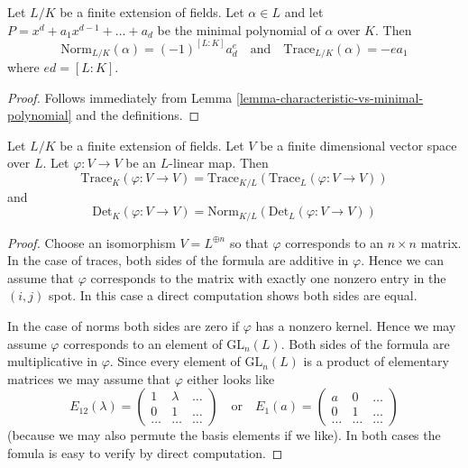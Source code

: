 \begin{lemma}
\label{lemma-trace-and-norm-from-minimal-polynomial}
Let $L/K$ be a finite extension of fields. Let $\alpha \in L$ and let
$P = x^d + a_1 x^{d - 1} + \ldots + a_d$
be the minimal polynomial of $\alpha$ over $K$. Then
$$
\text{Norm}_{L/K}(\alpha) = (-1)^{[L : K]} a_d^e
\quad\text{and}\quad
\text{Trace}_{L/K}(\alpha) = - e a_1
$$
where $e d = [L : K]$.
\end{lemma}

\begin{proof}
Follows immediately from Lemma \ref{lemma-characteristic-vs-minimal-polynomial}
and the definitions.
\end{proof}

\begin{lemma}
\label{lemma-trace-and-norm-linear}
Let $L/K$ be a finite extension of fields. Let $V$ be a finite dimensional
vector space over $L$. Let $\varphi : V \to V$ be an $L$-linear map.
Then
$$
\text{Trace}_K(\varphi : V \to V) =
\text{Trace}_{K/L}(\text{Trace}_L(\varphi : V \to V))
$$
and
$$
\text{Det}_K(\varphi : V \to V) =
\text{Norm}_{K/L}(\text{Det}_L(\varphi : V \to V))
$$
\end{lemma}

\begin{proof}
Choose an isomorphism $V = L^{\oplus n}$ so that $\varphi$ corresponds
to an $n \times n$ matrix. In the case of traces, both sides of the formula
are additive in $\varphi$. Hence we can assume that $\varphi$
corresponds to the matrix with exactly one nonzero entry in the $(i, j)$ spot.
In this case a direct computation shows both sides are equal.

\medskip\noindent
In the case of norms both sides are zero if $\varphi$ has a nonzero kernel.
Hence we may assume $\varphi$ corresponds to an element of
$\text{GL}_n(L)$. Both sides of the formula are multiplicative in $\varphi$.
Since every element of $\text{GL}_n(L)$ is a product of elementary
matrices we may assume that $\varphi$ either looks like
$$
E_{12}(\lambda) =
\left(
\begin{matrix}
1 & \lambda & \ldots \\
0 & 1 & \ldots \\
\ldots & \ldots & \ldots
\end{matrix}
\right)
\quad\text{or}\quad
E_1(a) =
\left(
\begin{matrix}
a & 0 & \ldots \\
0 & 1 & \ldots \\
\ldots & \ldots & \ldots
\end{matrix}
\right)
$$
(because we may also permute the basis elements if we like).
In both cases the fomula is easy to verify by direct computation.
\end{proof}


